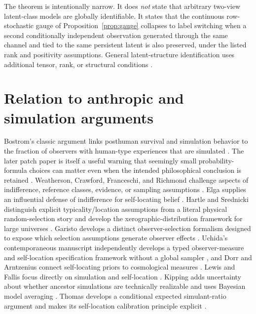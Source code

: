 \documentclass[11pt]{article}
\begin{document}
The theorem is intentionally narrow. It does \emph{not} state that arbitrary two-view latent-class models are globally identifiable. It states that the continuous row-stochastic gauge of Proposition~\ref{prop:gauge} collapses to label switching when a second conditionally independent observation generated through the same channel and tied to the same persistent latent is also preserved, under the listed rank and positivity assumptions. General latent-structure identification uses additional tensor, rank, or structural conditions \citep{allman2009}.

\section{Relation to anthropic and simulation arguments}
Bostrom's classic argument links posthuman survival and simulation behavior to the fraction of observers with human-type experiences that are simulated \citep{bostrom2003}. The later patch paper is itself a useful warning that seemingly small probability-formula choices can matter even when the intended philosophical conclusion is retained \citep{bostromkulczycki2011}. Weatherson, Crawford, Franceschi, and Richmond challenge aspects of indifference, reference classes, evidence, or sampling assumptions \citep{weatherson2003,crawford2013,franceschi2014,richmond2017}. Elga supplies an influential defense of indifference for self-locating belief \citep{elga2004}. Hartle and Srednicki distinguish explicit typicality/location assumptions from a literal physical random-selection story and develop the xerographic-distribution framework for large universes \citep{hartlesrednicki2007,srednickihartle2013}. Garisto develops a distinct observer-selection formalism designed to expose which selection assumptions generate observer effects \citep{garisto2020}. Uchida's contemporaneous manuscript independently develops a typed observer-measure and self-location specification framework without a global sampler \citep{uchida2026}, and Dorr and Arntzenius connect self-locating priors to cosmological measures \citep{dorrarntzenius2017}. Lewis and Fallis focus directly on simulation and self-location \citep{fallislewis2023}. Kipping adds uncertainty about whether ancestor simulations are technically realizable and uses Bayesian model averaging \citep{kipping2020}. Thomas develops a conditional expected simulant-ratio argument and makes its self-location calibration principle explicit \citep{thomas2024}.
\end{document}
